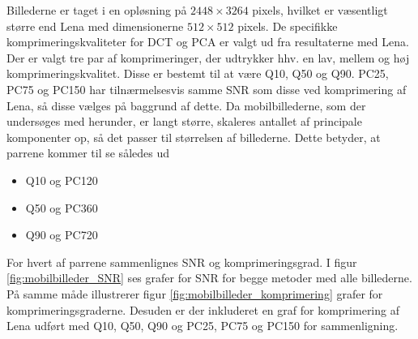 Billederne er taget i en opløsning på $2448 \times 3264$ pixels, hvilket er væsentligt større end Lena med dimensionerne $512 \times 512$ pixels. De specifikke komprimeringskvaliteter for DCT og PCA er valgt ud fra resultaterne med Lena.\\
Der er valgt tre par af komprimeringer, der udtrykker hhv. en lav, mellem og høj komprimeringskvalitet. Disse er bestemt til at være Q10, Q50 og Q90. PC25, PC75 og PC150 har tilnærmelsesvis samme SNR som disse ved komprimering af Lena, så disse vælges på baggrund af dette. Da mobilbillederne, som der undersøges med herunder, er langt større, skaleres antallet af principale komponenter op, så det passer til størrelsen af billederne. Dette betyder, at parrene kommer til se således ud
\begin{itemize}
	\item[]{Q10 og PC120}
	\item[]{Q50 og PC360}
	\item[]{Q90 og PC720}
\end{itemize}
For hvert af parrene sammenlignes SNR og komprimeringsgrad. I figur \ref{fig:mobilbilleder_SNR} ses grafer for SNR for  begge metoder med alle billederne. På samme måde illustrerer figur \ref{fig:mobilbilleder_komprimering} grafer for komprimeringsgraderne. Desuden er der inkluderet en graf for komprimering af Lena udført med Q10, Q50, Q90 og PC25, PC75 og PC150 for sammenligning.
